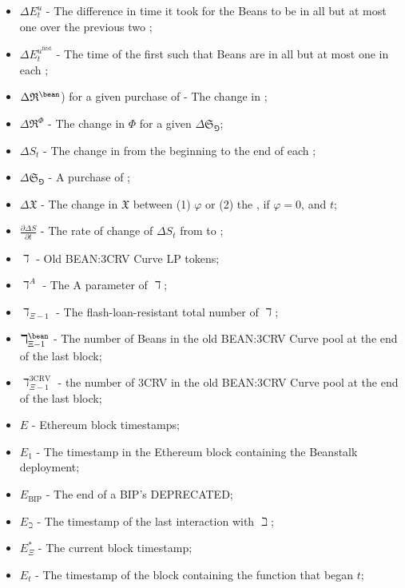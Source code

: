 \documentclass[class=article, crop=false]{standalone}
\begin{document}
\begin{itemize}[topsep=0pt, itemsep=3pt,leftmargin=16pt]
    \item[] $\Delta E_{t}^{u}$ - The difference in time it took for the Beans to be  in all but at most one  over the previous two ;
    \item[] $\Delta E_{t}^{u^{\text{first}}}$ - The time of the first  such that Beans are  in all but at most one  in each ;
    \item[] $\Delta \mathfrak{R}^{\bean}$) for a given purchase of  - The change in  \Bean;
    \item[] $\Delta \mathfrak{R}^{\Phi}$ - The change in  $\Phi$ for a given $\Delta \mathfrak{S}_{\Game}$;
    \item[] $\Delta S_t$ - The change in  from the beginning to the end of each ;
    \item[] $\Delta \mathfrak{S}_{\Game}$ - A purchase of ;
    \item[] $\Delta \mathfrak{X}$ - The change in $\mathfrak{X}$ between (1) $\varphi$ or (2) the , if $\varphi = 0$, and $t$;
    \item[] $\frac{\partial \Delta S}{\partial t}$ - The rate of change of $\Delta S_t$ from  to ;
    \item[] $\daleth$ - Old BEAN:3CRV Curve LP tokens;
    \item[] $\daleth^{A}$ - The A parameter of $\daleth$;
    \item[] $\daleth_{\Xi-1}$ - The flash-loan-resistant total number of $\daleth$;
    \item[] $\daleth_{\Xi-1}^{\bean}$ - The number of Beans in the old BEAN:3CRV Curve pool at the end of the last block;
    \item[] $\daleth_{\Xi-1}^{\text{3CRV}}$ - the number of 3CRV in the old BEAN:3CRV Curve pool at the end of the last block;
    \item[] $E$ - Ethereum block timestamps;
    \item[] $E_1$ - The timestamp in the Ethereum block containing the Beanstalk deployment;
    \item[] $E_{\text{BIP}}$ - The end of a BIP's  DEPRECATED;
    \item[] $E_{\beth}$ - The timestamp of the last interaction with $\beth$;
    \item[] $E_{\Xi}^*$ - The current block timestamp;
    \item[] $E_t$ - The timestamp of the block containing the  function that began $t$;

\end{itemize}
\end{document}
